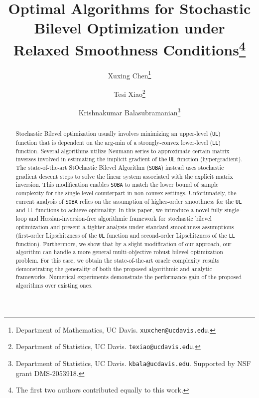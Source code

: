 \documentclass[10pt]{article}
\title{Optimal Algorithms for Stochastic Bilevel Optimization under Relaxed Smoothness Conditions\footnote{The first two authors contributed equally to this work.}}
\author{Xuxing Chen\thanks{Department of Mathematics, UC Davis. \texttt{xuxchen@ucdavis.edu}. }
\and 
Tesi Xiao\thanks{Department of Statistics, UC Davis. \texttt{texiao@ucdavis.edu}. }
\and Krishnakumar Balasubramanian\thanks{Department of Statistics, UC Davis. \texttt{kbala@ucdavis.edu}. Supported by NSF grant DMS-2053918.} 
}
\theoremstyle{remark}
\begin{document}
\maketitle
\begin{abstract}

Stochastic Bilevel optimization usually involves minimizing an upper-level (\texttt{UL}) function that is dependent on the arg-min of a strongly-convex lower-level (\texttt{LL}) function. Several algorithms utilize Neumann series to approximate certain matrix inverses involved in estimating the implicit gradient of the \texttt{UL} function (hypergradient). The state-of-the-art StOchastic Bilevel Algorithm (\texttt{SOBA}) \cite{dagreou2022framework} instead uses stochastic gradient descent steps to solve the linear system associated with the explicit matrix inversion. This modification enables \texttt{SOBA} to match the lower bound of sample complexity for the single-level counterpart in non-convex settings. Unfortunately, the current analysis of \texttt{SOBA} relies on the assumption of higher-order smoothness for the \texttt{UL} and \texttt{LL} functions to achieve optimality. In this paper, we introduce a novel fully single-loop and Hessian-inversion-free algorithmic framework for stochastic bilevel optimization and present a tighter analysis under standard smoothness assumptions (first-order Lipschitzness of the \texttt{UL} function and second-order Lipschitzness of the \texttt{LL} function). Furthermore, we show that by a slight modification of our approach, our algorithm can handle a more general multi-objective robust bilevel optimization problem. For this case, we obtain the state-of-the-art oracle complexity results demonstrating the generality of both the proposed algorithmic and analytic frameworks. Numerical experiments demonstrate the performance gain of the proposed algorithms over existing ones.

\end{abstract}
\end{document}
